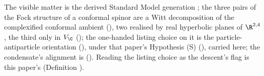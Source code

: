 The visible matter is the derived Standard Model generation \cite{ButlerT12}; the three pairs of the Fock structure of a conformal spinor are a Witt decomposition of the complexified conformal ambient \cite[Thm.~5.3]{ButlerT9} (), two realised by real hyperbolic planes of $\R^{2,4}$, the third only in $V_{\C}$ \cite[proof of Thm.~3.1]{ButlerT9} (); the one-handed listing choice on it is the particle-antiparticle orientation \cite[Prop.~5.6]{ButlerT12} (), under that paper's Hypothesis (S) (), carried here; the condensate's alignment is \cite[Prop.~4.3]{ButlerT13} (). Reading the listing choice as the descent's flag is this paper's (Definition ).
